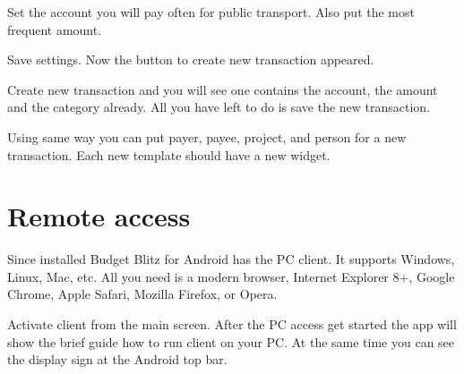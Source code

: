 \documentclass[a4paper,10pt,english]{sphinxmanual}
\begin{document}
\noindent{}
\noindent{}
\noindent{}

\sphinxAtStartPar
Set the account you will pay often for public transport. Also put the most frequent amount.

\noindent{}
\noindent{}
\noindent{}

\sphinxAtStartPar
Save settings. Now the button to create new transaction appeared.

\noindent{}

\sphinxAtStartPar
Create new transaction and you will see one contains the account, the amount and the category already.
All you have left to do is save the new transaction.

\sphinxAtStartPar
Using same way you can put payer, payee, project, and person for a new transaction. Each new
template should have a new widget.

\sphinxstepscope


\chapter{Remote access}
\label{\detokenize{remote-access:remote-access}}\label{\detokenize{remote-access:chapter-remote-access}}\label{\detokenize{remote-access::doc}}
\sphinxAtStartPar
Since installed Budget Blitz for Android has the PC client. It supports Windows, Linux, Mac, etc. All you need is
a modern browser, Internet Explorer 8+, Google Chrome, Apple Safari, Mozilla Firefox, or Opera.

\noindent{}
\noindent{}
\noindent{}

\sphinxAtStartPar
Activate client from the main screen. After the PC access get started the app will show
the brief guide how to run client on your PC. At the same time you can see the display sign
at the Android top bar.
\end{document}

